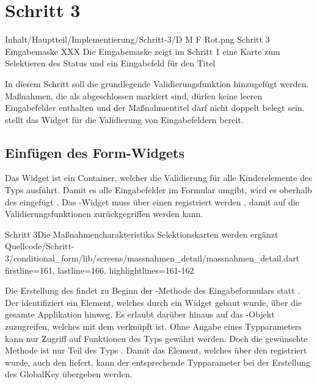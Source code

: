 \chapter{Schritt 3}
\label{chap:Schritt-3}



  
  \begin{alexfigure}{Inhalt/Hauptteil/Implementierung/Schritt-3/D M F Rot.png}
    {Schritt 3 Eingabemaske}
    {XXX Die Eingabemaske zeigt im Schritt 1 eine Karte zum Selektieren des Status und ein Eingabefeld für den Titel}
  
    \label{fig:Schritt3Eingabemaske}
  
  \end{alexfigure}

In diesem Schritt soll die grundlegende Validierungsfunktion hinzugefügt werden.
Maßnahmen, die als abgeschlossen markiert sind, dürfen keine leeren Eingabefelder enthalten und der Maßnahmentitel darf nicht doppelt belegt sein.
 stellt das Widget  für die Validierung von Eingabefeldern bereit.

\section{Einfügen des Form-Widgets}

Das Widget  ist ein Container, welcher die Validierung für alle Kinderelemente des Typs  ausführt.
Damit es alle Eingabefelder im Formular umgibt, wird es oberhalb des  eingefügt .
Das -Widget muss über einen  registriert werden , damit auf die Validierungsfunktionen zurückgegriffen werden kann.

\begin{alexlisting}{Schritt 3}{Die Maßnahmencharakteristika Selektionskarten werden ergänzt}
    {Quellcode/Schritt-3/conditional_form/lib/screens/massnahmen_detail/massnahmen_detail.dart}
    {firstline=161, lastline=166, highlightlines={161-162}}
    \label{lst:Schritt3Form}
\end{alexlisting}
  
Die Erstellung des  findet zu Beginn der -Methode des Eingabeformulars statt .
Der  identifiziert ein Element, welches durch ein Widget gebaut wurde, über die gesamte Applikation hinweg.
Es erlaubt darüber hinaus auf das -Objekt zuzugreifen, welches mit dem  verknüpft ist.
Ohne Angabe eines Typparameters kann nur Zugriff auf Funktionen des Typs  gewährt werden.
Doch die gewünschte Methode  ist nur Teil des Typs .
Damit das Element, welches über den  registriert wurde, auch den  liefert, kann der entsprechende Typparameter  bei der Erstellung des GlobalKey übergeben werden.

